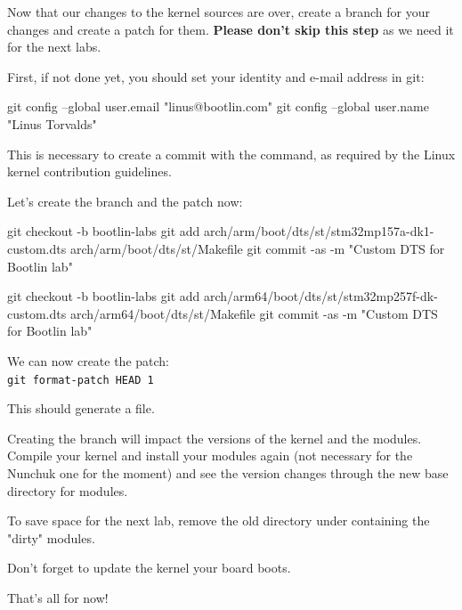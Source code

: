 Now that our changes to the kernel sources are over,
create a branch for your changes and create a patch for them.
{\bf Please don't skip this step} as we need it for the next labs.

First, if not done yet, you should set your identity
and e-mail address in git:

\begin{bashinput}
git config --global user.email "linus@bootlin.com"
git config --global user.name "Linus Torvalds"
\end{bashinput}

This is necessary to create a commit with the 
command, as required by the Linux kernel contribution guidelines.

Let's create the branch and the patch now:

\if{}
\begin{bashinput}
git checkout -b bootlin-labs
git add arch/arm/boot/dts/st/stm32mp157a-dk1-custom.dts arch/arm/boot/dts/st/Makefile
git commit -as -m "Custom DTS for Bootlin lab"
\end{bashinput}
\fi
\if{}
\begin{bashinput}
git checkout -b bootlin-labs
git add arch/arm64/boot/dts/st/stm32mp257f-dk-custom.dts arch/arm64/boot/dts/st/Makefile
git commit -as -m "Custom DTS for Bootlin lab"
\end{bashinput}
\fi

We can now create the patch:\\
\texttt{git format-patch HEAD~1}

This should generate a 
file.

Creating the branch will impact the versions of the kernel and the modules.
Compile your kernel and install your modules again (not necessary for the
Nunchuk one for the moment) and see the version changes through the
new base directory for modules.

To save space for the next lab, remove the old directory under
 containing the "dirty" modules.

Don't forget to update the kernel your board boots.

That's all for now!
